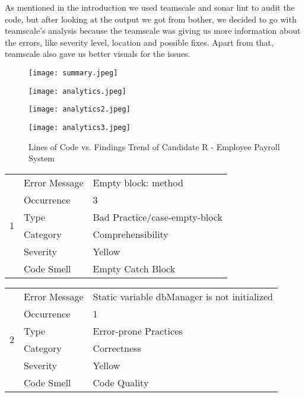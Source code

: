 \documentclass[12pt,english]{article}
\begin{document}
As mentioned in the introduction we used teamscale and sonar lint to audit the code, but after looking at the output we got from bother, we decided to go with teamscale's analysis because the teamscale was giving us more information about the errors, like severity level, location and possible fixes. Apart from that, teamscale also gave us better visuals for the issues. 


\begin{figure}[h!]
    \centering
    \texttt{[image: summary.jpeg]}
\end{figure}


\begin{figure}[h!]
    \texttt{[image: analytics.jpeg]}
\end{figure}

\begin{figure}[h!]
    \texttt{[image: analytics2.jpeg]}
\end{figure}

\begin{figure}[h!]
    \texttt{[image: analytics3.jpeg]}
    \caption{Lines of Code vs. Findings Trend of Candidate R - Employee Payroll System}
\end{figure}


\newpage

\begin{table}[!ht]
    \begin{tabularx}{\textwidth}{|c|l|X|}
    \hline
        \multirow{6}{*}{1} & Error Message & Empty block: method \\ \cline{2-3}
        & Occurrence & 3 \\ \cline{2-3}
        & Type & Bad Practice/case-empty-block \\ \cline{2-3}
        & Category & Comprehensibility \\ \cline{2-3}
        & Severity & Yellow \\ \cline{2-3}
        & Code Smell & Empty Catch Block \\ \hline
    \end{tabularx}
\end{table}

\begin{table}[!ht]
    \begin{tabularx}{\textwidth}{|c|l|X|}
    \hline
        \multirow{6}{*}{2} & Error Message & Static variable dbManager is not initialized \\ \cline{2-3}
        & Occurrence & 1 \\ \cline{2-3}
        & Type & Error-prone Practices \\ \cline{2-3}
        & Category & Correctness \\ \cline{2-3}
        & Severity & Yellow \\ \cline{2-3}
        & Code Smell & Code Quality \\ \hline
    \end{tabularx}
\end{table}
\end{document}

